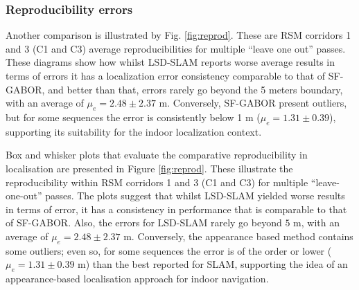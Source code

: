 \subsubsection{Reproducibility errors}

Another comparison is illustrated by Fig. \ref{fig:reprod}. These are RSM corridors 1 and 3 (C1 and C3) average reproducibilities for multiple ``leave one out'' passes. These diagrams show how whilst LSD-SLAM reports worse average results in terms of errors it has a localization error consistency comparable to that of SF-GABOR, and better than that, errors rarely go beyond the 5 meters boundary, with an average of $\mu_e = 2.48 \pm 2.37$ m. Conversely, SF-GABOR present outliers, but for some sequences the error is consistently below 1 m ($\mu_e = 1.31 \pm 0.39$), supporting its suitability for the indoor localization context.

Box and whisker plots that evaluate the comparative reproducibility in localisation are presented in Figure \ref{fig:reprod}. These illustrate the reproducibility within RSM corridors 1 and 3 (C1 and C3) for multiple ``leave-one-out'' passes. The plots suggest that whilst LSD-SLAM yielded worse results in terms of error, it has a consistency in performance that is comparable to that of SF-GABOR. Also, the errors for LSD-SLAM rarely go beyond $5$ m, with an average of $\mu_e = 2.48 \pm 2.37$ m. Conversely, the appearance based method contains some outliers; even so, for some sequences the error is of the order or lower ($\mu_e = 1.31 \pm 0.39$ m) than the best reported for SLAM, supporting the idea of an appearance-based localisation approach for indoor navigation. 

